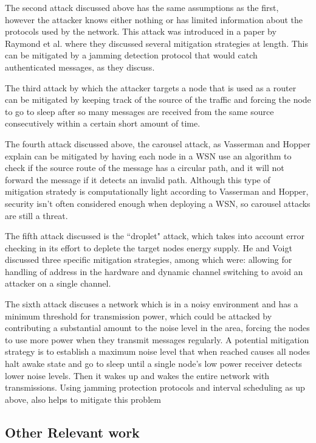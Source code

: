 The second attack discussed above has the same assumptions as the first, however the attacker knows either nothing or has limited information about the protocols used by the network. This attack was introduced in a paper by
Raymond et al. where they discussed several mitigation strategies at length\cite{4476299}. This can be mitigated by a jamming detection protocol that would catch authenticated messages, as they discuss. 

The third attack by which the attacker targets a node that is used as a router can be mitigated by keeping track of the source of the traffic and forcing the node to go to sleep after so many messages are received from the same
source consecutively within a certain short amount of time.

The fourth attack discussed above, the carousel attack, as Vasserman and Hopper explain can be mitigated by having each node in a WSN use an algorithm to check if the source route of the message has a circular path, and it will not forward the message if it detects an invalid path\cite{6112758}. Although this type of mitigation stratedy is computationally light according to Vasserman and Hopper, security isn't often considered enough when deploying a WSN, so carousel attacks are still a threat. 

The fifth attack discussed is the ``droplet" attack, which takes into account error checking in its effort to deplete the target nodes energy supply. He and Voigt discussed three specific mitigation strategies, among which were:
 allowing for handling of address in the hardware and dynamic channel switching to avoid an attacker on a single channel.

The sixth attack discuses a network which is in a noisy environment and has a minimum threshold for transmission power, which could be attacked by contributing a substantial amount to the noise level in the area, forcing the nodes
to use more power when they transmit messages regularly. A potential mitigation strategy is to establish a maximum noise level that when reached causes all nodes halt awake state and go to sleep until a single node's low power receiver detects lower noise levels.
Then it wakes up and wakes the entire network with transmissions. Using jamming protection protocols and interval scheduling as up above, also helps to mitigate this problem\cite{4476299}
 
\subsection{Other Relevant work}


